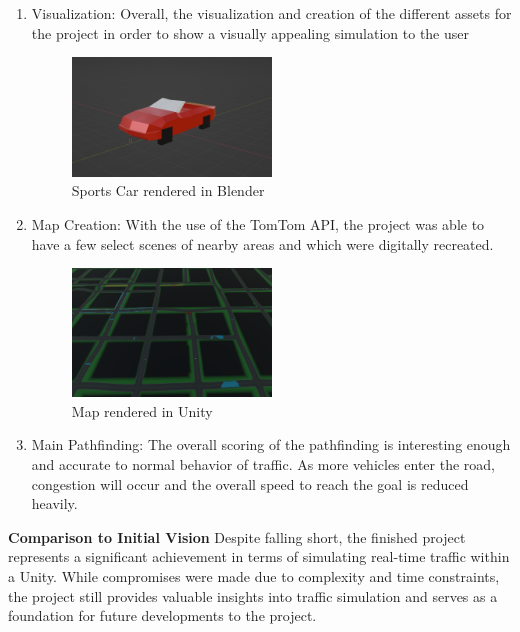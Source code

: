 \begin{enumerate}
	\item Visualization: Overall, the visualization and creation of the different assets for the project in order to show a visually appealing simulation to the user
	\begin{figure}[htbp]
	    \centering
	    \includegraphics[width=0.5\textwidth]{Images/SportsCar.png}
	    \caption{Sports Car rendered in Blender}
	    \label{fig:SportsCar}
	\end{figure}
	\item Map Creation: With the use of the TomTom API, the project was able to have a few select scenes of nearby areas and which were digitally recreated.
	\begin{figure}[htbp]
	    \centering
	    \includegraphics[width=0.5\textwidth]{Images/Map.png}
	    \caption{Map rendered in Unity}
	    \label{fig:Map}
	\end{figure}
	\item Main Pathfinding: The overall scoring of the pathfinding is interesting enough and accurate to normal behavior of traffic. As more vehicles enter the road, congestion will occur and the overall speed to reach the goal is reduced heavily.
\end{enumerate}
\textbf{Comparison to Initial Vision}
Despite falling short, the finished project represents a significant achievement in terms of simulating real-time traffic within a Unity. While compromises were made due to complexity and time constraints, the project still provides valuable insights into traffic simulation and serves as a foundation for future developments to the project.
